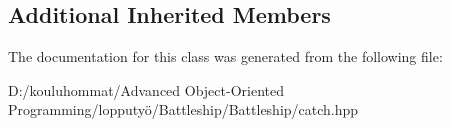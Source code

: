 \subsection*{Additional Inherited Members}


The documentation for this class was generated from the following file\+:\begin{DoxyCompactItemize}
\item 
D\+:/kouluhommat/\+Advanced Object-\/\+Oriented Programming/lopputyö/\+Battleship/\+Battleship/catch.\+hpp\end{DoxyCompactItemize}
